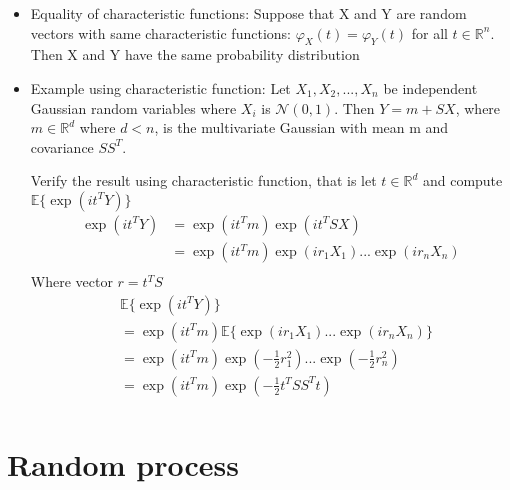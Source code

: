 \documentclass[12pt]{article}
\begin{document}
\begin{itemize}
\begin{itemize}
\end{itemize}

\item Equality of characteristic functions: Suppose that X and Y are random vectors with same characteristic functions: $\varphi_{X}(t) = \varphi_{Y}(t)$ for all $t \in \mathbb{R}^n$. Then X and Y have the same probability distribution

\item Example using characteristic function:
Let $X_1,X_2,...,X_n$ be independent Gaussian random variables where $X_i$ is $\mathcal{N}(0,1)$. Then $Y=m+SX$, where $m\in \mathbb{R}^d$ where $d<n$, is the multivariate Gaussian with mean m and covariance $SS^T$.

Verify the result using characteristic function, that is let $t \in \mathbb{R}^d $ and compute $\mathbb{E}\{\exp{(it^TY)}\}$
\begin{align*}
\exp{(it^TY)} &= \exp(it^Tm)\exp(it^TSX) \\
&=\exp(it^Tm)\exp(ir_1X_1)...\exp(ir_nX_n)\\
\end{align*}
Where vector $r=t^TS$
\begin{align*}
&\mathbb{E}\{\exp{(it^TY)}\} \\
&= \exp(it^Tm)\mathbb{E}\{ \exp(ir_1X_1)...\exp(ir_nX_n)\}\\
&= \exp(it^Tm) \exp(-\frac{1}{2}r_1^2)...\exp(-\frac{1}{2}r_n^2)\\
&= \exp(it^Tm) \exp(-\frac{1}{2}t^TSS^Tt)\\
\end{align*}
\end{itemize}

\section{Random process}
\end{document}
